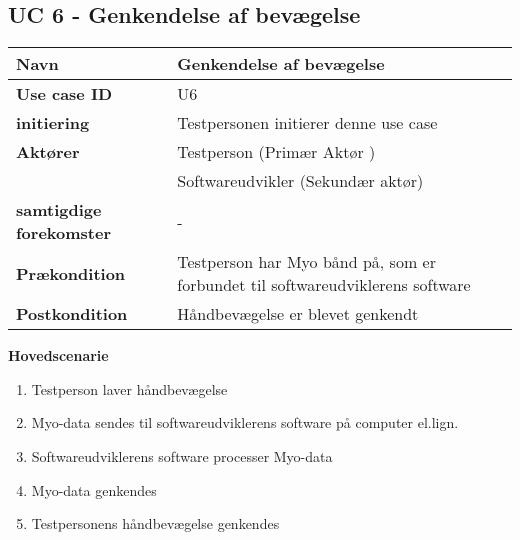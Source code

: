 \subsection{UC 6 - Genkendelse af bevægelse}
\begin{table}[htbp] 
	\begin{tabular}{|p{5cm}|p{9cm}|}
		\hline
		\textbf{Navn} & Genkendelse af bevægelse  \\ \hline
		\textbf{Use case ID} & U6 \\ \hline
		\textbf{initiering} & Testpersonen initierer denne use case \\ \hline
		\textbf{Aktører} & Testperson (Primær Aktør )\\ & Softwareudvikler (Sekundær aktør) \\ \hline
		\textbf{samtigdige forekomster} & - \\ \hline
		\textbf{Prækondition} & Testperson har Myo bånd på, som er forbundet til softwareudviklerens software \\ \hline
		\textbf{Postkondition} & Håndbevægelse er blevet genkendt\\ \hline
	\end{tabular}
\end{table}
\textbf{Hovedscenarie}
\begin{enumerate}
	\item Testperson laver håndbevægelse
	\item Myo-data sendes til softwareudviklerens software på computer el.lign.
	\item Softwareudviklerens software processer Myo-data
	\item Myo-data genkendes
	\item Testpersonens håndbevægelse genkendes
\end{enumerate}